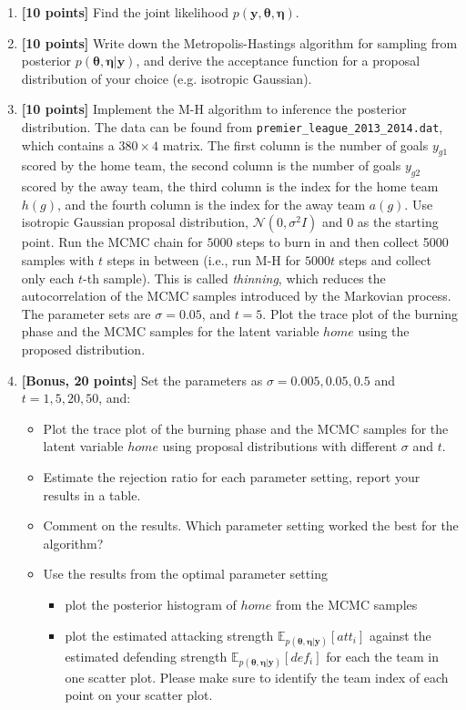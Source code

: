 \documentclass{article}
\newcommand{\yv}{\mathbf{y}}
\newcommand{\etav       }{\boldsymbol \eta       }
\newcommand{\thetav     }{\boldsymbol \theta     }
\begin{document}
\begin{enumerate}
\item \textbf{[10 points]} Find the joint likelihood $p(\yv, \thetav, \etav)$.
\item \textbf{[10 points]} Write down the Metropolis-Hastings algorithm for sampling from posterior $p(\thetav, \etav | \yv)$, and derive the acceptance function for a proposal distribution of your choice (e.g. isotropic Gaussian).
\item \textbf{[10 points]} Implement the M-H algorithm to inference the posterior distribution. The data can be found from \texttt{premier\_league\_2013\_2014.dat}, which contains a $380 \times 4$ matrix. The first column is the number of goals $y_{g1}$ scored by the home team, the second column is the number of goals  $y_{g2}$ scored by the away team, the third column is the index for the home team $h(g)$, and the fourth column is the index for the away team $a(g)$. 
Use isotropic Gaussian proposal distribution, $\mathcal{N}(0, \sigma^2 I)$ and 0 as the starting point. Run the MCMC chain for $5000$ steps to burn in and then collect 5000 samples with $t$ steps in between (i.e., run M-H for $5000t$ steps and collect only each $t$-th sample). This is called \textit{thinning}, which reduces the autocorrelation of the MCMC samples introduced by the Markovian process. The parameter sets are $\sigma = 0.05$, and $t =5$. Plot the trace plot of the burning phase and the MCMC samples for the latent variable $home$ using the proposed distribution.

\item \textbf{[Bonus, 20 points]} Set the parameters as $\sigma = 0.005, 0.05, 0.5$ and $t = 1, 5, 20, 50$, and:
\begin{itemize}
\item Plot the trace plot of the burning phase and the MCMC samples for the latent variable $home$ using proposal distributions with different $\sigma$ and $t$. 
\item Estimate the rejection ratio for each parameter setting, report your results in a table. 
\item Comment on the results. Which parameter setting worked the best for the algorithm? 
\item Use the results from the optimal parameter setting 
\begin{itemize}
\item plot the posterior histogram of $home$ from the MCMC samples
\item plot the estimated attacking strength $\mathbb{E}_{p(\thetav, \etav | \yv)}[att_i]$ against the estimated defending strength $\mathbb{E}_{p(\thetav, \etav | \yv)}[def_i]$ for each the team in one scatter plot. Please make sure to identify the team index of each point on your scatter plot.
\end{itemize}
\end{itemize}
\end{enumerate}
\end{document}
